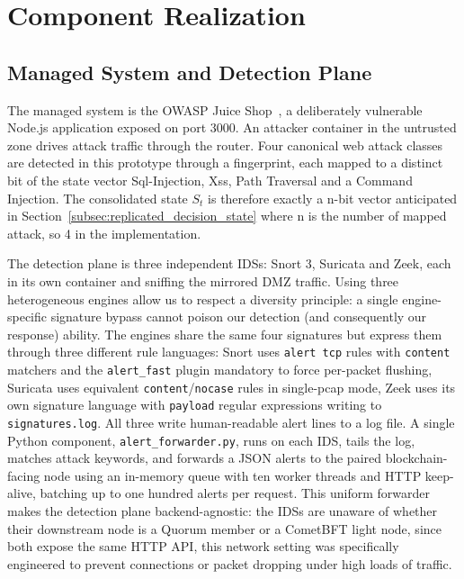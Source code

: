 \section{Component Realization}
\label{sec:impl_components}

\subsection{Managed System and Detection Plane}
\label{subsec:impl_managed_ids}
The managed system is the OWASP Juice Shop~\cite{owaspjuiceshop}, a deliberately vulnerable Node.js application exposed on port 3000. An attacker container in the untrusted zone drives attack traffic through the router. Four canonical web attack classes are detected in this prototype through a fingerprint, each mapped to a distinct bit of the state vector Sql-Injection, Xss, Path Traversal and a Command Injection. The consolidated state $S_t$ is therefore exactly a n-bit vector anticipated in Section~\ref{subsec:replicated_decision_state} where n is the number of mapped attack, so 4 in the implementation.

The detection plane is three independent IDSs: Snort 3, Suricata and Zeek, each in its own container and sniffing the mirrored DMZ traffic. Using three heterogeneous engines allow us to respect a diversity principle: a single engine-specific signature bypass cannot poison our detection (and consequently our response) ability. The engines share the same four signatures but express them through three different rule languages: Snort uses \texttt{alert tcp} rules with \texttt{content} matchers and the \texttt{alert\_fast} plugin mandatory to force per-packet flushing, Suricata uses equivalent \texttt{content}/\texttt{nocase} rules in single-pcap mode, Zeek uses its own signature language with \texttt{payload} regular expressions writing to \texttt{signatures.log}. All three write human-readable alert lines to a log file. A single Python component, \texttt{alert\_forwarder.py}, runs on each IDS, tails the log, matches attack keywords, and forwards a JSON alerts to the paired blockchain-facing node using an in-memory queue with ten worker threads and HTTP keep-alive, batching up to one hundred alerts per request. This uniform forwarder makes the detection plane backend-agnostic: the IDSs are unaware of whether their downstream node is a Quorum member or a CometBFT light node, since both expose the same HTTP API, this network setting was specifically engineered to prevent connections or packet dropping under high loads of traffic.

